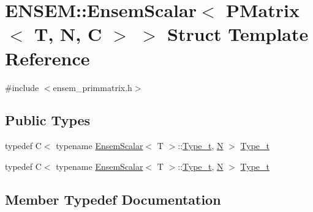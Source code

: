 \hypertarget{structENSEM_1_1EnsemScalar_3_01PMatrix_3_01T_00_01N_00_01C_01_4_01_4}{}\section{E\+N\+S\+EM\+:\+:Ensem\+Scalar$<$ P\+Matrix$<$ T, N, C $>$ $>$ Struct Template Reference}
\label{structENSEM_1_1EnsemScalar_3_01PMatrix_3_01T_00_01N_00_01C_01_4_01_4}


{\ttfamily \#include $<$ensem\+\_\+primmatrix.\+h$>$}

\subsection*{Public Types}
\begin{DoxyCompactItemize}
\item 
typedef C$<$ typename \mbox{\hyperlink{structENSEM_1_1EnsemScalar}{Ensem\+Scalar}}$<$ T $>$\+::\mbox{\hyperlink{structENSEM_1_1EnsemScalar_3_01PMatrix_3_01T_00_01N_00_01C_01_4_01_4_a63cd7ffca7507ffb61823092f6d0f8db}{Type\+\_\+t}}, \mbox{\hyperlink{operator__name__util_8cc_a7722c8ecbb62d99aee7ce68b1752f337}{N}} $>$ \mbox{\hyperlink{structENSEM_1_1EnsemScalar_3_01PMatrix_3_01T_00_01N_00_01C_01_4_01_4_a63cd7ffca7507ffb61823092f6d0f8db}{Type\+\_\+t}}
\item 
typedef C$<$ typename \mbox{\hyperlink{structENSEM_1_1EnsemScalar}{Ensem\+Scalar}}$<$ T $>$\+::\mbox{\hyperlink{structENSEM_1_1EnsemScalar_3_01PMatrix_3_01T_00_01N_00_01C_01_4_01_4_a63cd7ffca7507ffb61823092f6d0f8db}{Type\+\_\+t}}, \mbox{\hyperlink{operator__name__util_8cc_a7722c8ecbb62d99aee7ce68b1752f337}{N}} $>$ \mbox{\hyperlink{structENSEM_1_1EnsemScalar_3_01PMatrix_3_01T_00_01N_00_01C_01_4_01_4_a63cd7ffca7507ffb61823092f6d0f8db}{Type\+\_\+t}}
\end{DoxyCompactItemize}


\subsection{Member Typedef Documentation}
\mbox{\label{structENSEM_1_1EnsemScalar_3_01PMatrix_3_01T_00_01N_00_01C_01_4_01_4_a63cd7ffca7507ffb61823092f6d0f8db}} 
